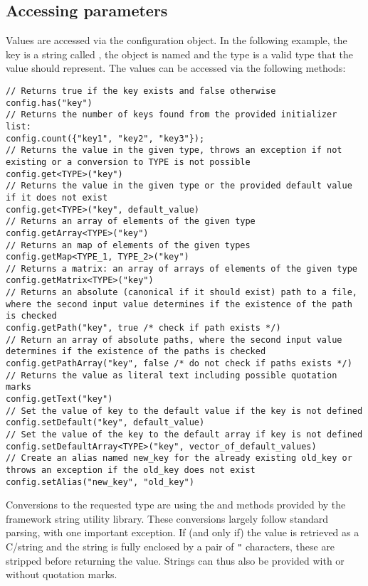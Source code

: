 \subsection{Accessing parameters}
\label{sec:accessing_parameters}
Values are accessed via the configuration object.
In the following example, the key is a string called , the object is named  and the type  is a valid \CPP type that the value should represent.
The values can be accessed via the following methods:
\begin{verbatim}
// Returns true if the key exists and false otherwise
config.has("key")
// Returns the number of keys found from the provided initializer list:
config.count({"key1", "key2", "key3"});
// Returns the value in the given type, throws an exception if not existing or a conversion to TYPE is not possible
config.get<TYPE>("key")
// Returns the value in the given type or the provided default value if it does not exist
config.get<TYPE>("key", default_value)
// Returns an array of elements of the given type
config.getArray<TYPE>("key")
// Returns an map of elements of the given types
config.getMap<TYPE_1, TYPE_2>("key")
// Returns a matrix: an array of arrays of elements of the given type
config.getMatrix<TYPE>("key")
// Returns an absolute (canonical if it should exist) path to a file, where the second input value determines if the existence of the path is checked
config.getPath("key", true /* check if path exists */)
// Return an array of absolute paths, where the second input value determines if the existence of the paths is checked
config.getPathArray("key", false /* do not check if paths exists */)
// Returns the value as literal text including possible quotation marks
config.getText("key")
// Set the value of key to the default value if the key is not defined
config.setDefault("key", default_value)
// Set the value of the key to the default array if key is not defined
config.setDefaultArray<TYPE>("key", vector_of_default_values)
// Create an alias named new_key for the already existing old_key or throws an exception if the old_key does not exist
config.setAlias("new_key", "old_key")
\end{verbatim}

Conversions to the requested type are using the  and  methods provided by the framework string utility library.
These conversions largely follow standard \CPP parsing, with one important exception.
If (and only if) the value is retrieved as a C/\CPP string and the string is fully enclosed by a pair of \texttt{"} characters, these are stripped before returning the value.
Strings can thus also be provided with or without quotation marks.

